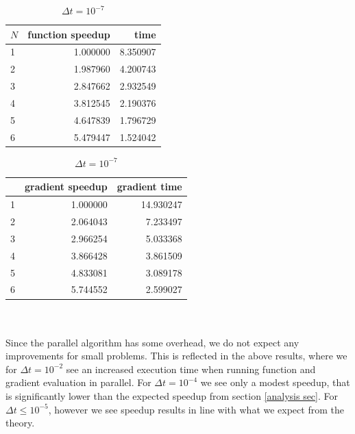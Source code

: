 \begin{table}[!h]
\centering
\caption{$\Delta t=10^{-7}$}
\begin{tabular}{lrr}
\toprule
{}$N$ &  function speedup &      time \\
\midrule
1 &  1.000000 &  8.350907 \\
2 &  1.987960 &  4.200743 \\
3 &  2.847662 &  2.932549 \\
4 &  3.812545 &  2.190376 \\
5 &  4.647839 &  1.796729 \\
6 &  5.479447 &  1.524042 \\
\bottomrule
\end{tabular}
\begin{tabular}{lrr}
\toprule
{} &  gradient speedup &     gradient  time \\
\midrule
1 &  1.000000 &  14.930247 \\
2 &  2.064043 &   7.233497 \\
3 &  2.966254 &   5.033368 \\
4 &  3.866428 &   3.861509 \\
5 &  4.833081 &   3.089178 \\
6 &  5.744552 &   2.599027 \\
\bottomrule
\end{tabular}
\end{table}
\\
\\
Since the parallel algorithm has some overhead, we do not expect any improvements for small problems. This is reflected in the above results, where we for $\Delta t = 10^{-2}$ see an increased execution time when running function and gradient evaluation in parallel. For $\Delta t = 10^{-4}$ we see only a modest speedup, that is significantly lower than the expected speedup from section \ref{analysis sec}. For $\Delta t \leq 10^{-5}$, however we see speedup results in line with what we expect from the theory.  
